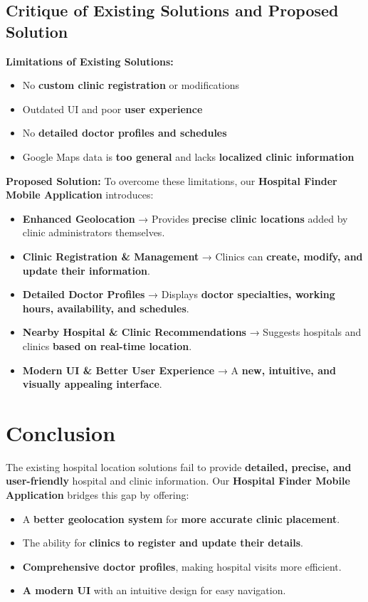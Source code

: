 \documentclass[12pt]{report}
\begin{document}
\subsection{\textbf{Critique of Existing Solutions and Proposed Solution}}

\textbf{Limitations of Existing Solutions:}
\begin{itemize}
	\item No \textbf{custom clinic registration} or modifications
	\item Outdated UI and poor \textbf{user experience}
	\item No \textbf{detailed doctor profiles and schedules}
	\item Google Maps data is \textbf{too general} and lacks \textbf{localized clinic information}
\end{itemize}

\noindent \textbf{Proposed Solution:}
To overcome these limitations, our \textbf{Hospital Finder Mobile Application} introduces:
\begin{itemize}
	\item \textbf{Enhanced Geolocation} → Provides \textbf{precise clinic locations} added by clinic administrators themselves.
	\item \textbf{Clinic Registration \& Management} → Clinics can \textbf{create, modify, and update their information}.
	\item \textbf{Detailed Doctor Profiles} → Displays \textbf{doctor specialties, working hours, availability, and schedules}.
	\item \textbf{Nearby Hospital \& Clinic Recommendations} → Suggests hospitals and clinics \textbf{based on real-time location}.
	\item \textbf{Modern UI \& Better User Experience} → A \textbf{new, intuitive, and visually appealing interface}.
\end{itemize}

\section{\textbf{Conclusion}}

The existing hospital location solutions fail to provide \textbf{detailed, precise, and user-friendly} hospital and clinic information. Our \textbf{Hospital Finder Mobile Application} bridges this gap by offering:
\begin{itemize}
	\item A \textbf{better geolocation system} for \textbf{more accurate clinic placement}.
	\item The ability for \textbf{clinics to register and update their details}.
	\item \textbf{Comprehensive doctor profiles}, making hospital visits more efficient.
	\item \textbf{A modern UI} with an intuitive design for easy navigation.
\end{itemize}
\end{document}
